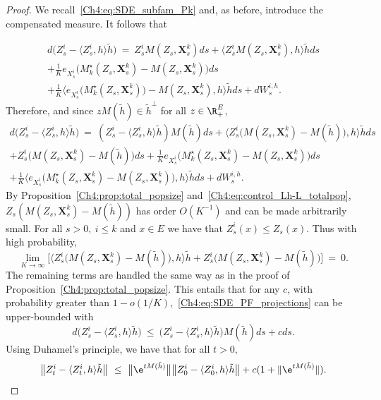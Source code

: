 \begin{refsegment}
\begin{proof}
We recall~\eqref{Ch4:eq:SDE_subfam_Pk} and, as before, introduce the compensated measure. It follows that 

\begin{multline*}
d \big(  Z^i_s- \langle  Z^i_s, h\rangle \tilde h\big) \  =\  Z^i_s M( Z_s, \bm X^k_s) ds 
+\big\langle Z^i_s M( Z_s, \bm X^k_s) , h\big\rangle  \tilde h ds\\
+ \frac{1}{K}e_{X^{i}_{s}}\big(M^\star_{k}(Z_s, \bm X^k_s)- M( Z_s, \bm X^k_s)\big) ds 
\\+\frac{1}{K}\big\langle e_{X^i_s}\big(M^\star_{k}( Z_s,  \bm X^k_s)\big) - M( Z_s, \bm X^k_s), h\big\rangle \tilde h ds
+d W^{i,h}_s.
\end{multline*}
Therefore, and since $z M(\tilde h) \in \tilde h^{\perp}$ for all $z\in \R^E_+$,
\begin{multline}\label{Ch4:eq:SDE_PF_projections}
d\big(  Z^i_s- \langle  Z^i_s, h\rangle \tilde h\big)\  =\  (  Z^i_s- \langle  Z^i_s, h\rangle \tilde h) M(\tilde h)ds 
+\big\langle Z^i_s\big(M( Z_s, \bm X^k_s)-M(\tilde h)\big) , h\big\rangle  \tilde h ds\\
+  Z^i_s \big(M( Z_s, \bm X^k_s)-M(\tilde h)\big) ds
+ \frac{1}{K}e_{X^{i}_{s}}\big(M^\star_{k}(Z_s, \bm X^k_s)- M( Z_s, \bm X^k_s)\big) ds \\
+\frac{1}{K}\big\langle e_{X^{i}_{s}}\big(M^\star_{k}( Z_s, \bm X^k_s)-  M( Z_s, \bm X^k_s)\big), h\big\rangle  \tilde h  ds
+d W^{i,h}_s.
\end{multline}
By Proposition~\ref{Ch4:prop:total_popsize} and~\eqref{Ch4:eq:control_Lh-L_totalpop},  $Z_s(M( Z_s, \bm X^k_s)-M(\tilde h)) $ has order $O(K^{-1})$ and can be made arbitrarily small. For all $s>0,\ i\leq k$ and $x\in E$ we have that $ Z^i_s(x)\leq  Z_s(x)$. Thus with high probability,
\[\lim_{K\to\infty}\Big[\big\langle  Z^i_s\big(M( Z_s, \bm X^k_s)-M(\tilde h)\big), h\big\rangle  \tilde h 
+ Z^i_s\big(M( Z_s, \bm X^k_s)-M(\tilde h)\big) \Big] \ =\ 0. \]
The remaining terms are handled the same way as in the proof of Proposition~\ref{Ch4:prop:total_popsize}.
This entails that for any $c$, with probability greater than $1-o(1/K)$,~\eqref{Ch4:eq:SDE_PF_projections} can be upper-bounded with
\[
d \big(  Z^i_s- \langle Z^{i}_s, h\rangle \tilde h\big)\  \leq\ \big(  Z^i_s- \langle  Z^{i}_s, h\rangle \tilde h\big)M(\tilde h) ds 
+ c ds .
\]
Using Duhamel's principle, we have that for all $t>0,$
\[
\big\lVert  Z^{i}_t- \langle Z^{i}_t, h\rangle \tilde h\big\rVert \ \leq\ \big\lVert \e^{tM(\tilde h)}\big\rVert \big\lVert  Z^{i}_{0}- \langle  Z^{i}_{0}, h\rangle \tilde h\big\rVert+ c(1+ \lVert \e^{tM(\tilde h)}\rVert).
\]
\end{proof}
\end{refsegment}
